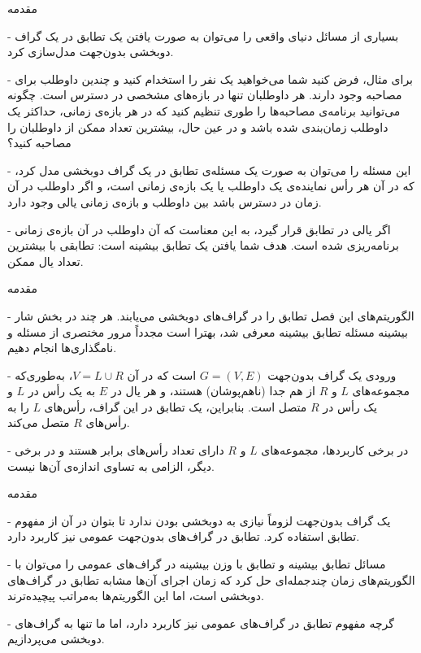 \begin{itemframe}{مقدمه}
\item[-]
بسیاری از مسائل دنیای واقعی را می‌توان به صورت یافتن یک تطابق در یک گراف دوبخشی بدون‌جهت مدل‌سازی کرد.
\item[-]
برای مثال، فرض کنید شما می‌خواهید یک نفر را استخدام کنید و چندین داوطلب برای مصاحبه وجود دارند.
هر داوطلبان تنها در بازه‌های مشخصی در دسترس است. چگونه می‌توانید برنامه‌ی مصاحبه‌ها را طوری تنظیم کنید که در هر بازه‌ی زمانی، حداکثر یک داوطلب زمان‌بندی شده باشد و در عین حال، بیشترین تعداد ممکن از داوطلبان را مصاحبه کنید؟
\item[-]
 این مسئله را می‌توان به صورت یک مسئله‌ی تطابق در یک گراف دو‌بخشی مدل کرد، که در آن هر رأس نماینده‌ی یک داوطلب یا یک بازه‌ی زمانی است، و اگر داوطلب در آن زمان در دسترس باشد بین داوطلب و بازه‌ی زمانی یالی وجود دارد.
\item[-]
اگر یالی در تطابق قرار گیرد، به این معناست که آن داوطلب در آن بازه‌ی زمانی برنامه‌ریزی شده است. هدف شما یافتن یک تطابق بیشینه است: تطابقی با بیشترین تعداد یال ممکن.
\end{itemframe}


\begin{itemframe}{مقدمه}
\item[-]
الگوریتم‌های این فصل تطابق را در گراف‌های دو‌بخشی می‌یابند. هر چند در بخش شار بیشینه مسئله تطابق بیشینه معرفی شد، بهترا است مجدداً مرور مختصری از مسئله و نامگذاری‌ها انجام دهیم.
\item[-]
ورودی یک گراف بدون‌جهت $G = (V, E)$ است که در آن $V = L \cup R$، به‌طوری‌که مجموعه‌های $L$ و $R$ از هم جدا (ناهم‌پوشان) هستند، و هر یال در $E$ به یک رأس در $L$ و یک رأس در $R$ متصل است. بنابراین، یک تطابق در این گراف، رأس‌های $L$ را به رأس‌های $R$ متصل می‌کند.
\item[-]
در برخی کاربردها، مجموعه‌های $L$ و $R$ دارای تعداد رأس‌های برابر هستند و در برخی دیگر، الزامی به تساوی اندازه‌ی آن‌ها نیست.
\end{itemframe}


\begin{itemframe}{مقدمه}
\item[-]
یک گراف بدون‌جهت لزوماً نیازی به دو‌بخشی بودن ندارد تا بتوان در آن از مفهوم تطابق استفاده کرد. تطابق در گراف‌های بدون‌جهت عمومی نیز کاربرد دارد.
\item[-]
مسائل تطابق بیشینه و تطابق با وزن بیشینه در گراف‌های عمومی را می‌توان با الگوریتم‌های زمان چندجمله‌ای حل کرد که زمان اجرای آن‌ها مشابه تطابق در گراف‌های دو‌بخشی است، اما این الگوریتم‌ها به‌مراتب پیچیده‌ترند.
\item[-]
 گرچه مفهوم تطابق در گراف‌های عمومی نیز کاربرد دارد، اما ما تنها به گراف‌های دو‌بخشی می‌پردازیم.
\end{itemframe}